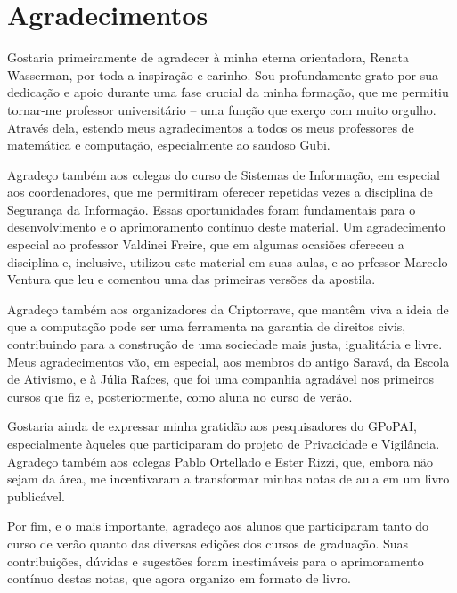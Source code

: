 \chapter*{Agradecimentos}

Gostaria primeiramente de agradecer à minha eterna orientadora, Renata Wasserman, por toda a inspiração e carinho.
Sou profundamente grato por sua dedicação e apoio durante uma fase crucial da minha formação, que me permitiu tornar-me professor universitário -- uma função que exerço com muito orgulho.
Através dela, estendo meus agradecimentos a todos os meus professores de matemática e computação, especialmente ao saudoso Gubi.

Agradeço também aos colegas do curso de Sistemas de Informação, em especial aos coordenadores, que me permitiram oferecer repetidas vezes a disciplina de Segurança da Informação.
Essas oportunidades foram fundamentais para o desenvolvimento e o aprimoramento contínuo deste material.
Um agradecimento especial ao professor Valdinei Freire, que em algumas ocasiões ofereceu a disciplina e, inclusive, utilizou este material em suas aulas, e ao prfessor Marcelo Ventura que leu e comentou uma das primeiras versões da apostila.

Agradeço também aos organizadores da Criptorrave, que mantêm viva a ideia de que a computação pode ser uma ferramenta na garantia de direitos civis, contribuindo para a construção de uma sociedade mais justa, igualitária e livre.
Meus agradecimentos vão, em especial, aos membros do antigo Saravá, da Escola de Ativismo, e à Júlia Raíces, que foi uma companhia agradável nos primeiros cursos que fiz e, posteriormente, como aluna no curso de verão.

Gostaria ainda de expressar minha gratidão aos pesquisadores do GPoPAI, especialmente àqueles que participaram do projeto de Privacidade e Vigilância.
Agradeço também aos colegas Pablo Ortellado e Ester Rizzi, que, embora não sejam da área, me incentivaram a transformar minhas notas de aula em um livro publicável.

Por fim, e o mais importante, agradeço aos alunos que participaram tanto do curso de verão quanto das diversas edições dos cursos de graduação.
Suas contribuições, dúvidas e sugestões foram inestimáveis para o aprimoramento contínuo destas notas, que agora organizo em formato de livro.
